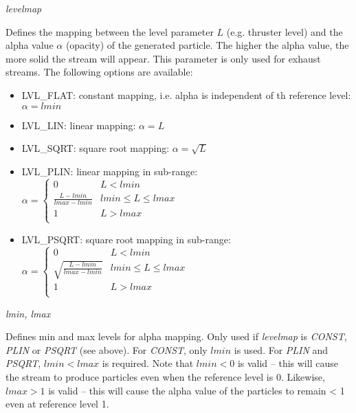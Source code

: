 \documentclass[Orbiter Developer Manual.tex]{subfiles}
\begin{document}
\noindent
\textit{levelmap}
\begin{adjustwidth}{1cm}{0cm}
Defines the mapping between the level parameter $L$ (e.g. thruster level) and the alpha value $\alpha$ (opacity) of the generated particle. The higher the alpha value, the more solid the stream will appear. This parameter is only used for exhaust streams. The following options are available:

\begin{itemize}
\item LVL\_FLAT: constant mapping, i.e. alpha is independent of th reference level: $\alpha = lmin$
\item LVL\_LIN: linear mapping: $\alpha = L$
\item LVL\_SQRT: square root mapping: $\alpha = \sqrt{L}$
\item LVL\_PLIN: linear mapping in sub-range: $\alpha = 
\left\{
\begin{array}{ll}
	0 & L < lmin \\
	\frac{L - lmin}{lmax - lmin} & lmin \leq L \leq lmax \\
	1 & L > lmax \\
\end{array} 
\right. $
\item LVL\_PSQRT: square root mapping in sub-range: $\alpha =
\left\{
\begin{array}{ll}
	0 & L < lmin \\
	\sqrt{\frac{L - lmin}{lmax - lmin}} & lmin \leq L \leq lmax \\
	1 & L > lmax \\
\end{array} 
\right. $
\end{itemize}
\end{adjustwidth}

\noindent
\textit{lmin, lmax}
\begin{adjustwidth}{1cm}{0cm}
Defines min and max levels for alpha mapping. Only used if \textit{levelmap} is \textit{CONST}, \textit{PLIN} or \textit{PSQRT} (see above). For \textit{CONST}, only $lmin$ is used. For \textit{PLIN} and \textit{PSQRT}, $lmin < lmax$ is required. Note that $lmin < 0$ is valid – this will cause the stream to produce particles even when the reference level is 0. Likewise, $lmax > 1$ is valid – this will cause the alpha value of the particles to remain < 1 even at reference level 1.
\\
\end{adjustwidth}
\end{document}

